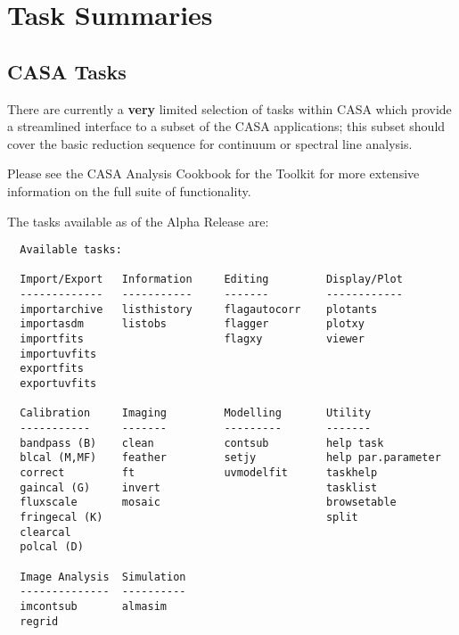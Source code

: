 

\chapter[Appendix: Task Summaries]{Task Summaries}
\label{chapter:tasks}

\section{CASA Tasks}
\label{section:tasks.list}

There are currently a {\bf very} limited selection of tasks within
CASA which provide a streamlined interface to a subset of the CASA
applications; this subset should cover the basic reduction sequence
for continuum or spectral line analysis.

Please see the CASA Analysis Cookbook for the Toolkit for more
extensive information on the full suite of functionality.

The tasks available as of the Alpha Release are: 

\small
\begin{verbatim}
  Available tasks: 

  Import/Export   Information     Editing         Display/Plot
  -------------   -----------     -------         ------------
  importarchive   listhistory     flagautocorr    plotants
  importasdm      listobs         flagger         plotxy 
  importfits                      flagxy          viewer
  importuvfits
  exportfits
  exportuvfits

  Calibration     Imaging         Modelling       Utility
  -----------     -------         ---------       -------
  bandpass (B)    clean           contsub         help task
  blcal (M,MF)    feather         setjy           help par.parameter
  correct         ft              uvmodelfit      taskhelp
  gaincal (G)     invert                          tasklist
  fluxscale       mosaic                          browsetable
  fringecal (K)                                   split
  clearcal
  polcal (D)

  Image Analysis  Simulation
  --------------  ----------
  imcontsub       almasim
  regrid
\end{verbatim}
\normalsize

